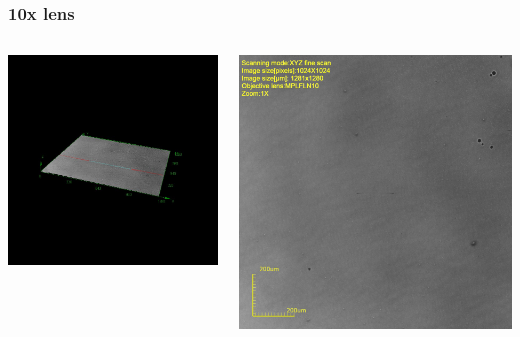 \documentclass[bigger, english, 10pt, presentation]{beamer}
\begin{document}
\begin{frame}
\frametitle{10x lens}
\label{sec-1-1-1}
\begin{columns}
\begin{column}{0.5\textwidth}
\label{sec-1-1-1-1}

\includegraphics[width=.9\linewidth]{./figures/111208_As2S3_AsDep_UniformSite_10x_3D.jpeg}
\end{column}
\begin{column}{0.5\textwidth}
\label{sec-1-1-1-2}

\includegraphics[width=.9\linewidth]{./figures/111208_As2S3_AsDep_UniformSite_10x_2D.jpeg}
\end{column}
\end{columns}
\end{frame}
\end{document}
